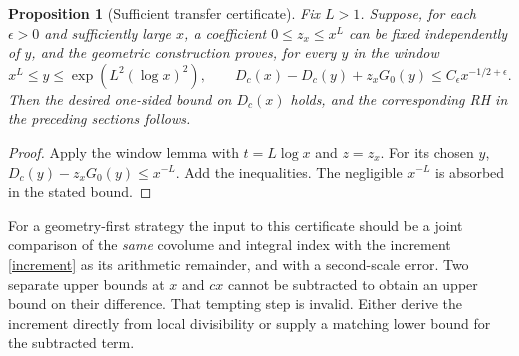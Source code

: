 \documentclass[11pt]{article}
\newtheorem{proposition}[theorem]{Proposition}
\theoremstyle{definition}\newtheorem{definition}[theorem]{Definition}
\begin{document}
\begin{proposition}[Sufficient transfer certificate]\label{cert}
Fix $L>1$. Suppose, for each $\epsilon>0$ and sufficiently large $x$, a coefficient $0\le z_x\le x^L$ can be fixed independently of $y$, and the geometric construction proves, for every $y$ in the window
\[
 x^L\le y\le\exp(L^2(\log x)^2),\qquad
 D_c(x)-D_c(y)+z_xG_0(y)\le C_\epsilon x^{-1/2+\epsilon}.
\]
Then the desired one-sided bound on $D_c(x)$ holds, and the corresponding RH in the preceding sections follows.
\end{proposition}
\begin{proof}
Apply the window lemma with $t=L\log x$ and $z=z_x$. For its chosen $y$, $D_c(y)-z_xG_0(y)\le x^{-L}$. Add the inequalities. The negligible $x^{-L}$ is absorbed in the stated bound.
\end{proof}
For a geometry-first strategy the input to this certificate should be a joint comparison of the \emph{same} covolume and integral index with the increment \eqref{increment} as its arithmetic remainder, and with a second-scale error. Two separate upper bounds at $x$ and $cx$ cannot be subtracted to obtain an upper bound on their difference. That tempting step is invalid. Either derive the increment directly from local divisibility or supply a matching lower bound for the subtracted term.
\end{document}
